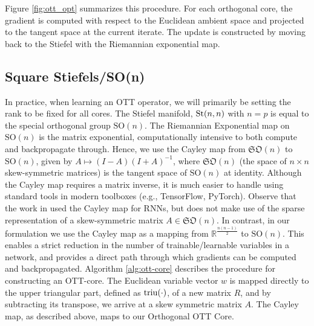 Figure \ref{fig:ott_opt} summarizes this procedure. For each orthogonal core, the gradient is computed with respect to the Euclidean ambient space and projected to the tangent space at the current iterate. The update is constructed by moving back to the Stiefel with the Riemannian exponential map.

\subsection{Square Stiefels/SO(n)}
In practice, when learning an OTT operator, we will primarily be setting the rank to be fixed for all cores.
The Stiefel manifold, $\text{St}(n,n)$ with $n=p$ is equal to the special orthogonal group $\text{SO}(n)$.
The Riemannian Exponential map on $\text{SO}(n)$ is the matrix exponential, computationally intensive to both compute and backpropagate through.
Hence, we use the Cayley map from $\mathfrak{SO}(n)$ to $\text{SO}(n)$, given by $A \mapsto \left(I-A\right)\left(I+A\right)^{-1}$, where $\mathfrak{SO}(n)$ (the space of $n\times n$ skew-symmetric matrices) is the tangent space of $\text{SO}(n)$ at identity.
Although the Cayley map requires a matrix inverse, it is much easier to handle using standard tools
in modern toolboxes (e.g., TensorFlow, PyTorch).
Observe that
the work in \cite{helfrich2017orthogonal} used the Cayley map for RNNs, but does not make use of the sparse representation of a skew-symmetric matrix $A \in \mathfrak{SO}(n)$.
In contrast, in our formulation we use the Cayley map as a mapping from $\mathbb{R}^{\frac{n(n-1)}{2}}$ to $\text{SO}(n)$. This enables a strict reduction in the number of trainable/learnable variables in a network, and provides a direct path through which gradients can be computed and backpropagated.
Algorithm \ref{alg:ott-core} describes the procedure for constructing an OTT-core.
The Euclidean variable vector $w$ is mapped directly to the upper triangular part, defined as $\operatorname*{triu}(\cdot)$, of a new matrix $R$, and by subtracting its transpose,
we arrive at a skew symmetric matrix $A$. The Cayley map, as described above, maps to our Orthogonal OTT Core. 


